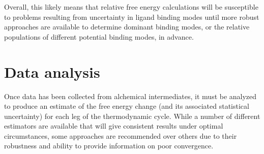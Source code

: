 \documentclass[9pt,bestpractices]{livecoms}
\begin{document}
Overall, this likely means that relative free energy calculations will be susceptible to problems resulting from uncertainty in ligand binding modes until more robust approaches are available to determine dominant binding modes, or the relative populations of different potential binding modes, in advance.

\section{Data analysis}
\label{sec:data_analysis}
Once data has been collected from alchemical intermediates, it must be analyzed to produce an estimate of the free energy change (and its associated statistical uncertainty) for each leg of the thermodynamic cycle.
While a number of different estimators are available that will give consistent results under optimal circumstances, some approaches are recommended over others due to their robustness and ability to provide information on poor convergence.
\end{document}
